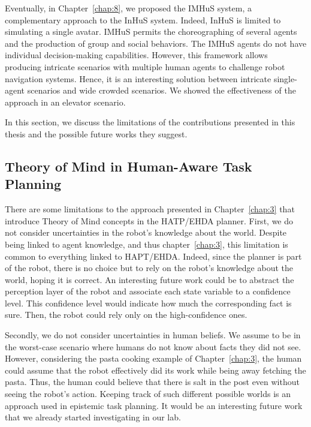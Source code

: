 Eventually, in Chapter~\ref{chap:8}, we proposed the IMHuS system, a complementary approach to the InHuS system. Indeed, InHuS is limited to simulating a single avatar. IMHuS permits the choreographing of several agents and the production of group and social behaviors. The IMHuS agents do not have individual decision-making capabilities. However, this framework allows producing intricate scenarios with multiple human agents to challenge robot navigation systems. Hence, it is an interesting solution between intricate single-agent scenarios and wide crowded scenarios. We showed the effectiveness of the approach in an elevator scenario. 



In this section, we discuss the limitations of the contributions presented in this thesis and the possible future works they suggest. 

\subsection*{Theory of Mind in Human-Aware Task Planning}

There are some limitations to the approach presented in Chapter~\ref{chap:3} that introduce Theory of Mind concepts in the HATP/EHDA planner.
First, we do not consider uncertainties in the robot's knowledge about the world. Despite being linked to agent knowledge, and thus chapter~\ref{chap:3}, this limitation is common to everything linked to HAPT/EHDA. Indeed, since the planner is part of the robot, there is no choice but to rely on the robot's knowledge about the world, hoping it is correct. An interesting future work could be to abstract the perception layer of the robot and associate each state variable to a confidence level. This confidence level would indicate how much the corresponding fact is sure. Then, the robot could rely only on the high-confidence ones. 

Secondly, we do not consider uncertainties in human beliefs. We assume to be in the worst-case scenario where humans do not know about facts they did not see. However, considering the pasta cooking example of Chapter~\ref{chap:3}, the human could assume that the robot effectively did its work while being away fetching the pasta. Thus, the human could believe that there is salt in the post even without seeing the robot's action. Keeping track of such different possible worlds is an approach used in epistemic task planning. It would be an interesting future work that we already started investigating in our lab. 

